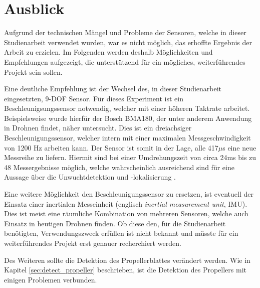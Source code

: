 
\chapter{Ausblick}
Aufgrund der technischen Mängel und Probleme der Sensoren, welche in dieser Studienarbeit verwendet wurden, war es nicht möglich, das erhoffte Ergebnis der Arbeit zu erzielen.
Im Folgenden werden deshalb Möglichkeiten und Empfehlungen aufgezeigt, die unterstützend für ein mögliches, weiterführendes Projekt sein sollen.

Eine deutliche Empfehlung ist der Wechsel des, in dieser Studienarbeit eingesetzten, \ac{9-DOF} Sensor.
Für dieses Experiment ist ein Beschleunigsungssensor notwendig, welcher mit einer höheren Taktrate arbeitet.
Beispielsweise wurde hierfür der Bosch BMA180, der unter anderem Anwendung in Drohnen findet, näher untersucht.
Dies ist ein dreiachsiger Beschleunigungssensor, welcher intern mit einer maximalen Messgeschwindigkeit von 1200 \ac{Hz} arbeiten kann.
Der Sensor ist somit in der Lage, alle 417$\mu$s eine neue Messreihe zu liefern.
Hiermit sind bei einer Umdrehungszeit von circa 24ms bis zu 48 Messergebnisse möglich, welche wahrscheinlich ausreichend sind für eine Aussage über die Unwuchtdetektion und -lokalisierung \cite{bosch_bma180}.

Eine weitere Möglichkeit den Beschleunigungssensor zu ersetzen, ist eventuell der Einsatz einer inertialen Messeinheit (englisch \textit{inertial measurement unit}, IMU).
Dies ist meist eine räumliche Kombination von mehreren Sensoren, welche auch Einsatz in heutigen Drohnen finden.
Ob diese den, für die Studienarbeit benötigten, Verwendungszweck erfüllen ist nicht bekannt und müsste für ein weiterführendes Projekt erst genauer recherchiert werden.

Des Weiteren sollte die Detektion des Propellerblattes verändert werden. Wie in Kapitel \ref{sec:detect_propeller} beschrieben, ist die Detektion des Propellers mit einigen Problemen verbunden. 
